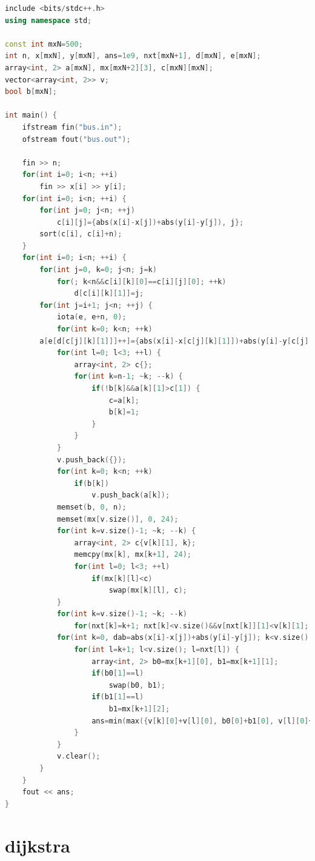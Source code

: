 \documentclass[12pt,twiside,a4paper]{ctexbook}
\numberwithin{chapter}{part}
\begin{document}
\begin{lstlisting}[language=c++,breaklines=true] 
include <bits/stdc++.h>
using namespace std;

const int mxN=500;
int n, x[mxN], y[mxN], ans=1e9, nxt[mxN+1], d[mxN], e[mxN];
array<int, 2> a[mxN], mx[mxN+2][3], c[mxN][mxN];
vector<array<int, 2>> v;
bool b[mxN];

int main() {
    ifstream fin("bus.in");
    ofstream fout("bus.out");

    fin >> n;
    for(int i=0; i<n; ++i)
        fin >> x[i] >> y[i];
    for(int i=0; i<n; ++i) {
        for(int j=0; j<n; ++j)
            c[i][j]={abs(x[i]-x[j])+abs(y[i]-y[j]), j};
        sort(c[i], c[i]+n);
    }
    for(int i=0; i<n; ++i) {
        for(int j=0, k=0; j<n; j=k)
            for(; k<n&&c[i][k][0]==c[i][j][0]; ++k)
                d[c[i][k][1]]=j;
        for(int j=i+1; j<n; ++j) {
            iota(e, e+n, 0);
            for(int k=0; k<n; ++k)
		a[e[d[c[j][k][1]]]++]={abs(x[i]-x[c[j][k][1]])+abs(y[i]-y[c[j][k][1]]), c[j][k][0]};
            for(int l=0; l<3; ++l) {
                array<int, 2> c{};
                for(int k=n-1; ~k; --k) {
                    if(!b[k]&&a[k][1]>c[1]) {
                        c=a[k];
                        b[k]=1;
                    }
                }
            }
            v.push_back({});
            for(int k=0; k<n; ++k)
                if(b[k])
                    v.push_back(a[k]);
            memset(b, 0, n);
            memset(mx[v.size()], 0, 24);
            for(int k=v.size()-1; ~k; --k) {
                array<int, 2> c{v[k][1], k};
                memcpy(mx[k], mx[k+1], 24);
                for(int l=0; l<3; ++l)
                    if(mx[k][l]<c)
                        swap(mx[k][l], c);
            }
            for(int k=v.size()-1; ~k; --k)
                for(nxt[k]=k+1; nxt[k]<v.size()&&v[nxt[k]][1]<v[k][1]; nxt[k]=nxt[nxt[k]]);
            for(int k=0, dab=abs(x[i]-x[j])+abs(y[i]-y[j]); k<v.size(); ++k) {
                for(int l=k+1; l<v.size(); l=nxt[l]) {
                    array<int, 2> b0=mx[k+1][0], b1=mx[k+1][1];
                    if(b0[1]==l)
                        swap(b0, b1);
                    if(b1[1]==l)
                        b1=mx[k+1][2];
                    ans=min(max({v[k][0]+v[l][0], b0[0]+b1[0], v[l][0]+dab+b0[0]}), ans);
                }
            }
            v.clear();
        }
    }
    fout << ans;
}
\end{lstlisting}

\chapter{dijkstra}
\end{document}

